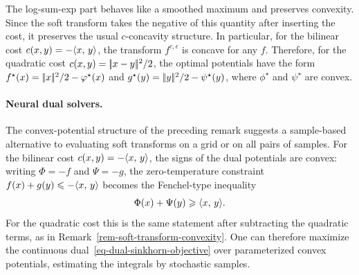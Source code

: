 \begin{rem}\label{rem-soft-transform-convexity}
	The log-sum-exp part behaves like a smoothed maximum and preserves convexity. Since the soft transform takes the negative of this quantity after inserting the cost, it preserves the usual $c$-concavity structure. In particular, for the bilinear cost $c(x,y)=-\langle x,\,y\rangle$, the transform $f^{c,\epsilon}$ is concave for any $f$. Therefore, for the quadratic cost $c(x,y)=|\!| x-y |\!|^2/2$, the optimal potentials have the form $f^\star(x)=|\!| x |\!|^2/2-\varphi^\star(x)$ and $g^\star(y)=|\!| y |\!|^2/2-\psi^\star(y)$, where $\phi^\star$ and $\psi^\star$ are convex.
\end{rem}

\paragraph{Neural dual solvers.}
The convex-potential structure of the preceding remark suggests a sample-based alternative to evaluating soft transforms on a grid or on all pairs of samples. For the bilinear cost \(c(x,y)=-\langle x,\,y\rangle\), the signs of the dual potentials are convex: writing \(\Phi=-f\) and \(\Psi=-g\), the zero-temperature constraint \(f(x)+g(y)\leqslant-\langle x,\,y\rangle\) becomes the Fenchel-type inequality
\[
	\Phi(x)+\Psi(y)\geqslant \langle x,\,y\rangle.
\]
For the quadratic cost this is the same statement after subtracting the quadratic terms, as in Remark~\ref{rem-soft-transform-convexity}. One can therefore maximize the continuous dual~\eqref{eq-dual-sinkhorn-objective} over parameterized convex potentials, estimating the integrals by stochastic samples.

